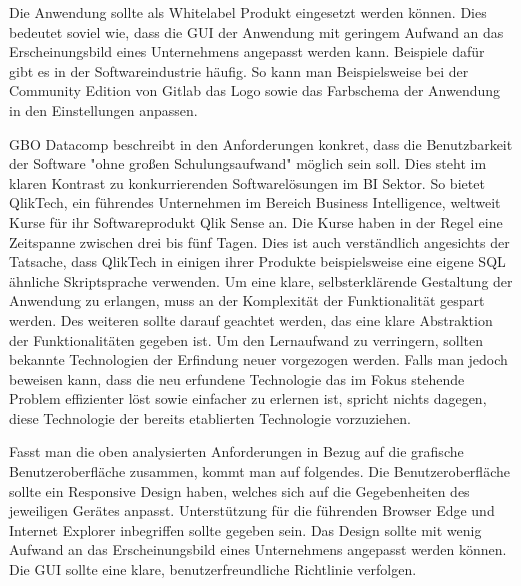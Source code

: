 Die Anwendung sollte als Whitelabel Produkt eingesetzt werden können. Dies bedeutet soviel wie,
dass die GUI der Anwendung mit geringem Aufwand an das Erscheinungsbild eines Unternehmens angepasst
werden kann. Beispiele dafür gibt es in der Softwareindustrie häufig. So kann man Beispielsweise bei
der Community Edition von Gitlab das Logo sowie das Farbschema der Anwendung in den Einstellungen
anpassen.\cite{GitlabDocs}

GBO Datacomp beschreibt in den Anforderungen konkret, dass die Benutzbarkeit der Software
"ohne großen Schulungsaufwand" möglich sein soll. \cite{GBODatacompHandbuchDashboard}
Dies steht im klaren Kontrast zu konkurrierenden Softwarelösungen im BI Sektor.
So bietet QlikTech, ein führendes Unternehmen im Bereich Business Intelligence,
weltweit Kurse für ihr Softwareprodukt Qlik Sense an. Die Kurse haben in der
Regel eine Zeitspanne zwischen drei bis fünf Tagen.\cite{QlikSenseTraining}
Dies ist auch verständlich angesichts der Tatsache, dass QlikTech in einigen
ihrer Produkte beispielsweise eine eigene SQL ähnliche Skriptsprache verwenden.\cite{QlikSenseScriptLanguage}
Um eine klare, selbsterklärende Gestaltung der Anwendung zu erlangen,
muss an der Komplexität der Funktionalität gespart werden. Des weiteren
sollte darauf geachtet werden, das eine klare Abstraktion der Funktionalitäten
gegeben ist. Um den Lernaufwand zu verringern, sollten bekannte Technologien
der Erfindung neuer vorgezogen werden. Falls man jedoch beweisen kann,
dass die neu erfundene Technologie das im Fokus stehende Problem effizienter löst
sowie einfacher zu erlernen ist, spricht nichts dagegen, diese Technologie der bereits
etablierten Technologie vorzuziehen.

Fasst man die oben analysierten Anforderungen in Bezug auf die grafische Benutzeroberfläche
zusammen, kommt man auf folgendes. Die Benutzeroberfläche sollte ein Responsive Design
haben, welches sich auf die Gegebenheiten des jeweiligen Gerätes anpasst. Unterstützung
für die führenden Browser Edge und Internet Explorer inbegriffen sollte gegeben sein.
Das Design sollte mit wenig Aufwand an das Erscheinungsbild eines Unternehmens angepasst werden
können. Die GUI sollte eine klare, benutzerfreundliche Richtlinie verfolgen.

